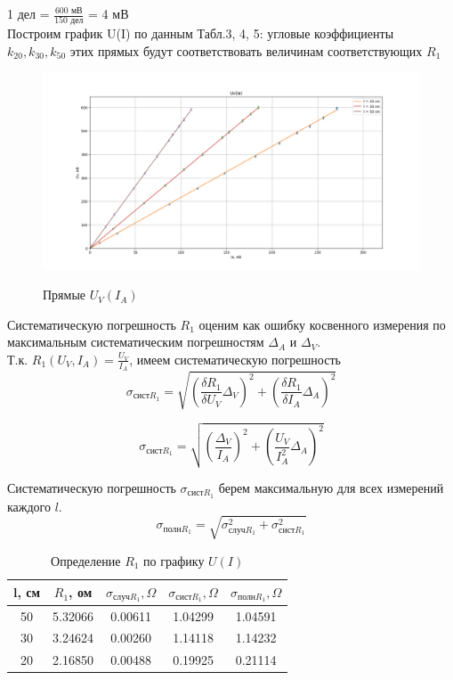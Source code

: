 \documentclass{article}
\begin{document}
	1 дел = $\frac{600 \text{ мВ}}{150 \text{ дел}}$ = 4 мВ\\
	
	Построим график U(I) по данным Табл.3, 4, 5: угловые коэффициенты $k_{20}, k_{30}, k_{50}$ этих прямых будут соответствовать величинам соответствующих ${R_{1}}$ 
	
	
	\begin{figure}[H]
		\centering
		 {
			\includegraphics[width = 1.4\linewidth]{Figure_2.png}}
		\caption{Прямые $U_{V}(I_{A})$ }
		\label{fig:enter-label}
	\end{figure}
	
	Систематическую погрешность $R_{1}$ оценим как ошибку косвенного измерения по максимальным систематическим погрешностям $\Delta_{A}$ и $\Delta_{V}$.\\  
	Т.к. $R_{1}(U_{V}, I_{A}) = \frac{U_{V}}{I_{A}}$, имеем систематическую погрешность
	\[\sigma_{\text{сист}R_{1}} = \sqrt{ (\frac{\delta R_{1}}{\delta U_{V}}\Delta_{V})^{2} + (\frac{\delta R_{1}}{\delta I_{A}}\Delta_{A})^{2} }\]
	
	\[\sigma_{\text{сист}R_{1}} = \sqrt{ (\frac{\Delta_{V}}{I_{A}})^{2} + (\frac{U_{V}}{I_{A}^{2}}\Delta_{A})^{2} }\]
	
	Систематическую погрешность $\sigma_{\text{сист}R_{1}}$ берем максимальную для всех измерений каждого $l$.
	$$\sigma_{\text{полн}R_{1}} = \sqrt{\sigma_{\text{случ}R_{1}}^{2} + \sigma_{\text{сист}R_{1}}^{2}}$$
	
	
	\begin{table}[H]
		\centering
		\begin{tabular}{|c|c|c|c|c|}
			\hline
			l, см & $R_{1}$, ом & $\sigma_{\text{случ}R_{1}}, \Omega$ & $\sigma_{\text{сист}R_{1}}, \Omega$ & $\sigma_{\text{полн}R_{1}}, \Omega$ \\ \hline
			50 & 5.32066 & 0.00611 & 1.04299 & 1.04591 \\ \hline
			30 & 3.24624 & 0.00260 & 1.14118 & 1.14232 \\ \hline
			20 & 2.16850 & 0.00488 & 0.19925 & 0.21114 \\ \hline
		\end{tabular}
		\caption{Определение $R_{1}$ по графику $U(I)$}
	\end{table}
	
\end{document}
